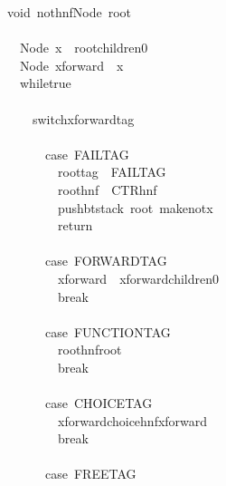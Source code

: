 \documentclass{book}
\theoremstyle{definition}
\begin{document}
{\begin{tabbing}\ttfamily
~void~nothnfNode~root\\
\ttfamily ~\\
\ttfamily ~~~Node~x~~rootchildren0\\
\ttfamily ~~~Node~xforward~~x\\
\ttfamily ~~~whiletrue\\
\ttfamily ~~~\\
\ttfamily ~~~~~switchxforwardtag\\
\ttfamily ~~~~~\\
\ttfamily ~~~~~~~case~FAILTAG\\
\ttfamily ~~~~~~~~~roottag~~FAILTAG\\
\ttfamily ~~~~~~~~~roothnf~~CTRhnf\\
\ttfamily ~~~~~~~~~pushbtstack~root~makenotx\\
\ttfamily ~~~~~~~~~return\\
\ttfamily ~\\
\ttfamily ~~~~~~~case~FORWARDTAG\\
\ttfamily ~~~~~~~~~xforward~~xforwardchildren0\\
\ttfamily ~~~~~~~~~break\\
\ttfamily ~\\
\ttfamily ~~~~~~~case~FUNCTIONTAG\\
\ttfamily ~~~~~~~~~roothnfroot\\
\ttfamily ~~~~~~~~~break\\
\ttfamily ~\\
\ttfamily ~~~~~~~case~CHOICETAG\\
\ttfamily ~~~~~~~~~xforwardchoicehnfxforward\\
\ttfamily ~~~~~~~~~break\\
\ttfamily ~~~~~~~\\
\ttfamily ~~~~~~~case~FREETAG\\

\end{tabbing}}
\end{document}
